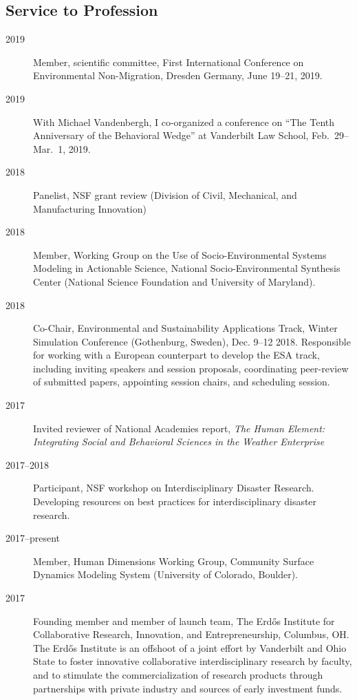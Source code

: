 \documentclass[10pt]{article}
\begin{document}
    \subsection{Service to Profession}
        \begin{description}
        	\item[2019] Member, scientific committee, First International Conference on Environmental Non-Migration, Dresden Germany, June 19--21, 2019.
            \item[2019] With Michael Vandenbergh, I co-organized a conference on ``The Tenth Anniversary of the Behavioral Wedge'' at Vanderbilt Law School, Feb.~29--Mar.~1, 2019.
            \item[2018] Panelist, NSF grant review (Division of Civil, Mechanical, and Manufacturing Innovation)
            \item[2018] Member, Working Group on the Use of Socio-Environmental Systems Modeling in Actionable Science, National Socio-Environmental Synthesis Center (National Science Foundation and University of Maryland).
            \item[2018] Co-Chair, Environmental and Sustainability Applications Track, Winter Simulation Conference (Gothenburg, Sweden), Dec. 9--12 2018. Responsible for working with a European counterpart to develop the ESA track, including inviting speakers and session proposals, coordinating peer-review of submitted papers, appointing session chairs, and scheduling session.
            \item[2017] Invited reviewer of National Academies report, \emph{The Human Element: Integrating Social and Behavioral Sciences in the Weather Enterprise}
            \item[2017--2018] Participant, NSF workshop on Interdisciplinary Disaster Research. Developing resources on best practices for interdisciplinary disaster research.
            \item[2017--present] Member, Human Dimensions Working Group, Community Surface Dynamics Modeling System (University of Colorado, Boulder).
            \item[2017] Founding member and member of launch team, The Erd\H{o}s Institute for Collaborative Research, Innovation, and Entrepreneurship, Columbus, OH. The Erd\H{o}s Institute is an offshoot of
a joint effort by Vanderbilt and Ohio State to foster innovative collaborative interdisciplinary research by faculty, and to stimulate the commercialization of research products through partnerships
with private industry and sources of early investment funds.

\end{description}
\end{document}
